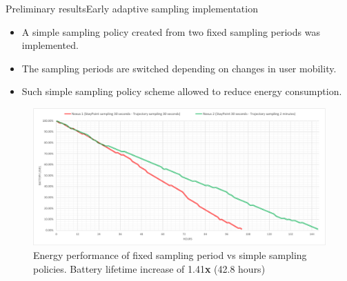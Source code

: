 \documentclass[8pt,xcolor={dvipsnames},handout]{beamer}
\begin{document}
\begin{frame}{Preliminary results}{Early adaptive sampling implementation}
\small{}
\begin{itemize}
  \item A simple sampling policy created from two fixed sampling periods was implemented.
  \item The sampling periods are switched depending on changes in user mobility.
  \item Such simple sampling policy scheme allowed to reduce energy consumption.
\end{itemize}

  \begin{figure}
  \centering
  \includegraphics[width=\columnwidth]{vectors/energy-performance-early-integral-test}
  \caption{Energy performance of fixed sampling period vs simple sampling policies. Battery lifetime increase of 1.41\textbf{x} (42.8 hours)}
  \label{fig:energy-performance-early-integral-test}
\end{figure}
\end{frame}



\end{document}
